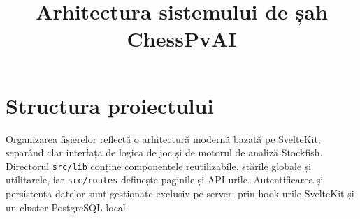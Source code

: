 \documentclass[12pt,a4paper]{article}
\title{\textbf{Arhitectura sistemului de șah ChessPvAI}}
\date{}
\author{}
\begin{document}
\maketitle
\thispagestyle{firstpage}
\tableofcontents
\newpage

\section{Structura proiectului}

Organizarea fișierelor reflectă o arhitectură modernă bazată pe SvelteKit, separând clar interfața de logica de joc și de motorul de analiză Stockfish. Directorul \texttt{src/lib} conține componentele reutilizabile, stările globale și utilitarele, iar \texttt{src/routes} definește paginile și API-urile. Autentificarea și persistența datelor sunt gestionate exclusiv pe server, prin hook-urile SvelteKit și un cluster PostgreSQL local.
\end{document}
